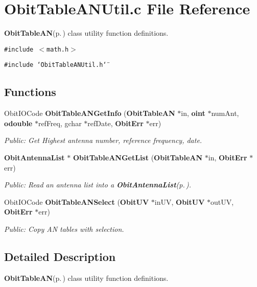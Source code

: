 \section{Obit\-Table\-ANUtil.c File Reference}
\label{ObitTableANUtil_8c}
{\bf Obit\-Table\-AN}{\rm (p.\,\pageref{structObitTableAN})} class utility function definitions. 

{\tt \#include $<$math.h$>$}\par
{\tt \#include \char`\"{}Obit\-Table\-ANUtil.h\char`\"{}}\par
\subsection*{Functions}
\begin{CompactItemize}
\item 
Obit\-IOCode {\bf Obit\-Table\-ANGet\-Info} ({\bf Obit\-Table\-AN} $\ast$in, {\bf oint} $\ast$num\-Ant, {\bf odouble} $\ast$ref\-Freq, gchar $\ast$ref\-Date, {\bf Obit\-Err} $\ast$err)
\begin{CompactList}\small\item\em Public: Get Highest antenna number, reference frequency, date. \item\end{CompactList}\item 
{\bf Obit\-Antenna\-List} $\ast$ {\bf Obit\-Table\-ANGet\-List} ({\bf Obit\-Table\-AN} $\ast$in, {\bf Obit\-Err} $\ast$err)
\begin{CompactList}\small\item\em Public: Read an antenna list into a {\bf Obit\-Antenna\-List}{\rm (p.\,\pageref{structObitAntennaList})}. \item\end{CompactList}\item 
Obit\-IOCode {\bf Obit\-Table\-ANSelect} ({\bf Obit\-UV} $\ast$in\-UV, {\bf Obit\-UV} $\ast$out\-UV, {\bf Obit\-Err} $\ast$err)
\begin{CompactList}\small\item\em Public: Copy AN tables with selection. \item\end{CompactList}\end{CompactItemize}


\subsection{Detailed Description}
{\bf Obit\-Table\-AN}{\rm (p.\,\pageref{structObitTableAN})} class utility function definitions. 



